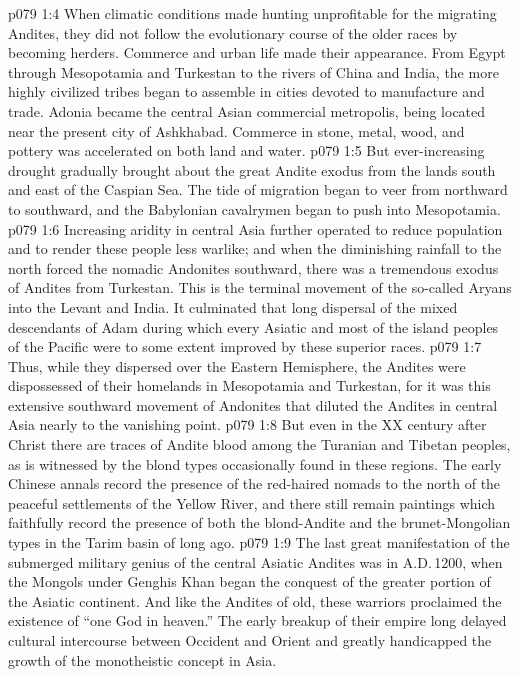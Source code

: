 \vs p079 1:4 When climatic conditions made hunting unprofitable for the migrating Andites, they did not follow the evolutionary course of the older races by becoming herders. Commerce and urban life made their appearance. From Egypt through Mesopotamia and Turkestan to the rivers of China and India, the more highly civilized tribes began to assemble in cities devoted to manufacture and trade. Adonia became the central Asian commercial metropolis, being located near the present city of Ashkhabad. Commerce in stone, metal, wood, and pottery was accelerated on both land and water.
\vs p079 1:5 But ever\hyp{}increasing drought gradually brought about the great Andite exodus from the lands south and east of the Caspian Sea. The tide of migration began to veer from northward to southward, and the Babylonian cavalrymen began to push into Mesopotamia.
\vs p079 1:6 Increasing aridity in central Asia further operated to reduce population and to render these people less warlike; and when the diminishing rainfall to the north forced the nomadic Andonites southward, there was a tremendous exodus of Andites from Turkestan. This is the terminal movement of the so\hyp{}called Aryans into the Levant and India. It culminated that long dispersal of the mixed descendants of Adam during which every Asiatic and most of the island peoples of the Pacific were to some extent improved by these superior races.
\vs p079 1:7 Thus, while they dispersed over the Eastern Hemisphere, the Andites were dispossessed of their homelands in Mesopotamia and Turkestan, for it was this extensive southward movement of Andonites that diluted the Andites in central Asia nearly to the vanishing point.
\vs p079 1:8 But even in the XX century after Christ there are traces of Andite blood among the Turanian and Tibetan peoples, as is witnessed by the blond types occasionally found in these regions. The early Chinese annals record the presence of the red\hyp{}haired nomads to the north of the peaceful settlements of the Yellow River, and there still remain paintings which faithfully record the presence of both the blond\hyp{}Andite and the brunet\hyp{}Mongolian types in the Tarim basin of long ago.
\vs p079 1:9 The last great manifestation of the submerged military genius of the central Asiatic Andites was in A.D.\,1200, when the Mongols under Genghis Khan began the conquest of the greater portion of the Asiatic continent. And like the Andites of old, these warriors proclaimed the existence of “one God in heaven.” The early breakup of their empire long delayed cultural intercourse between Occident and Orient and greatly handicapped the growth of the monotheistic concept in Asia.
